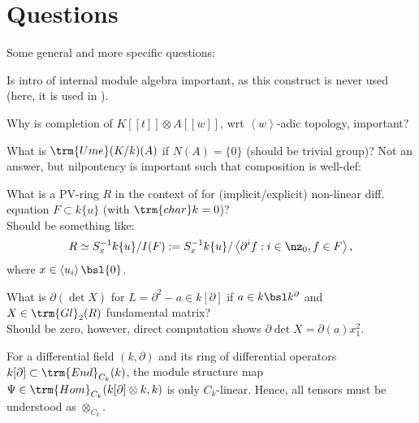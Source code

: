\section{Questions}
Some general and more specific questions:
\bn
\item Is intro of internal module algebra important, as this construct is never used (here, it is used in \cite{Heid13}).
\item Why is completion of $K[[t]] \otimes A[[w]]$, wrt $\left<w\right>$-adic topology, important?
\item What is $\trm{Ume}(K/k)(A)$ if $N(A) = \{0\}$ (should be trivial group)? Not an answer, but nilpontency is important such that composition is well-def:

\item What is a PV-ring $R$ in the context of for (implicit/explicit) non-linear diff. equation $F \subset k\{u\}$ (with $\trm{char} k = 0$)?\\
Should be something like:
$$R \simeq S^{-1}_x k\{u\}/I(F) := S^{-1}_x k\{u\}/\left<\partial^i f : i \in \nz_0, f \in F\right>,$$
where $x \in \left<u_i\right> \bsl \{0\}$.
\item What is $\partial (\det X)$ for $L = \partial^2 - a \in k[\partial]$ if $a \in k\bsl k^\partial$ and $X \in \trm{Gl}_2(R)$ fundamental matrix?\\
Should be zero, however, direct computation shows $\partial \det X = \partial(a) x_1^2$.
\item For a differential field $(k,\partial)$ and its ring of differential operators $k[\partial] \subset \trm{End}_{C_k}(k)$, the module structure map $\Psi \in \trm{Hom}_{C_k}(k[\partial] \otimes k,k)$ is only $C_k$-linear. Hence, all tensors must be understood as $\otimes_{C_k}$.
\en